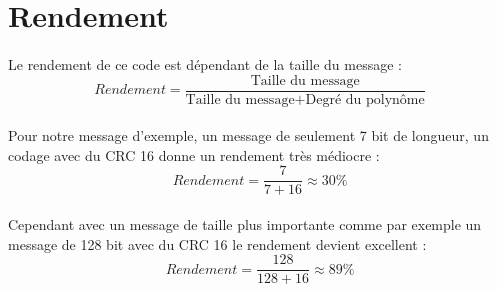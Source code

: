         \paragraph{}



    \section{Rendement}

        \paragraph{}
Le rendement de ce code est dépendant de la taille du message :
\[  Rendement = \frac{\text{Taille du message}}{\text{Taille du message} + \text{Degré du polynôme}} \]
        \paragraph{}
Pour notre message d'exemple, un message de seulement 7 bit de longueur, un codage avec du CRC 16 donne un rendement très médiocre :
\[  Rendement = \frac{7}{7 + 16} \approx 30\%  \]
        \paragraph{}
Cependant avec un message de taille plus importante comme par exemple un message de 128 bit avec du CRC 16 le rendement devient excellent :
\[  Rendement = \frac{128}{128 + 16} \approx 89\%  \]
